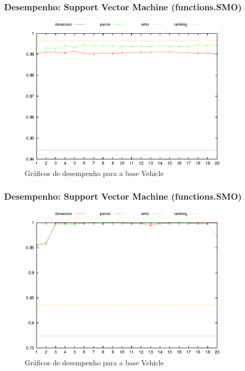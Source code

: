 \begin{frame}
    \frametitle{Desempenho: Support Vector Machine (functions.SMO)}

    \begin{figure}[H]
        \centering
        \includegraphics[width=0.9\textwidth]{img/vehicle_smo.eps}
        \caption{Gráficos de desempenho para a base Vehicle}
    \end{figure}
\end{frame}

\begin{frame}
    \frametitle{Desempenho: Support Vector Machine (functions.SMO)}

    \begin{figure}[H]
        \centering
        \includegraphics[width=0.9\textwidth]{img/yeast_smo.eps}
        \caption{Gráficos de desempenho para a base Vehicle}
    \end{figure}
\end{frame}